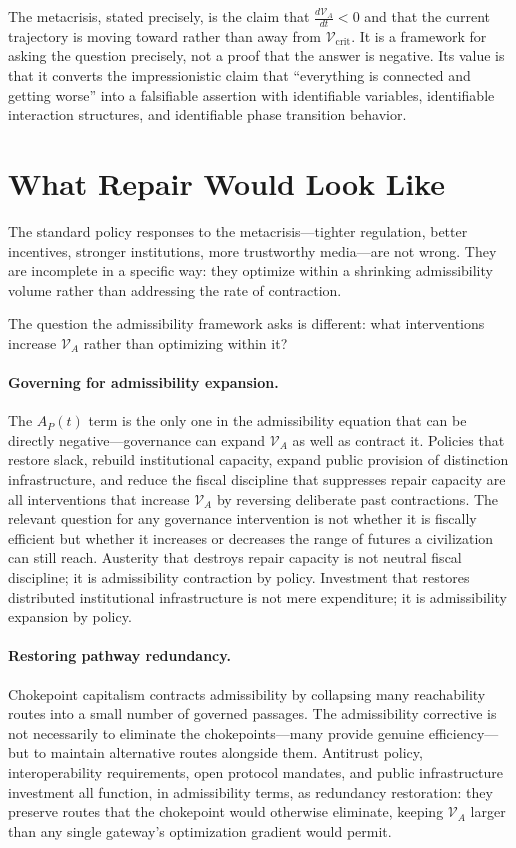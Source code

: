 \documentclass[11pt, letterpaper]{article}
\begin{document}
The metacrisis, stated precisely, is the claim that $\frac{d\mathcal{V}_A}{dt} < 0$ and that the current trajectory is moving toward rather than away from $\mathcal{V}_{\text{crit}}$. It is a framework for asking the question precisely, not a proof that the answer is negative. Its value is that it converts the impressionistic claim that ``everything is connected and getting worse'' into a falsifiable assertion with identifiable variables, identifiable interaction structures, and identifiable phase transition behavior.


\section{What Repair Would Look Like}

The standard policy responses to the metacrisis---tighter regulation, better incentives, stronger institutions, more trustworthy media---are not wrong. They are incomplete in a specific way: they optimize within a shrinking admissibility volume rather than addressing the rate of contraction.

The question the admissibility framework asks is different: what interventions increase $\mathcal{V}_A$ rather than optimizing within it?

\paragraph{Governing for admissibility expansion.} The $A_P(t)$ term is the only one in the admissibility equation that can be directly negative---governance can expand $\mathcal{V}_A$ as well as contract it. Policies that restore slack, rebuild institutional capacity, expand public provision of distinction infrastructure, and reduce the fiscal discipline that suppresses repair capacity are all interventions that increase $\mathcal{V}_A$ by reversing deliberate past contractions. The relevant question for any governance intervention is not whether it is fiscally efficient but whether it increases or decreases the range of futures a civilization can still reach. Austerity that destroys repair capacity is not neutral fiscal discipline; it is admissibility contraction by policy. Investment that restores distributed institutional infrastructure is not mere expenditure; it is admissibility expansion by policy.

\paragraph{Restoring pathway redundancy.} Chokepoint capitalism contracts admissibility by collapsing many reachability routes into a small number of governed passages. The admissibility corrective is not necessarily to eliminate the chokepoints---many provide genuine efficiency---but to maintain alternative routes alongside them. Antitrust policy, interoperability requirements, open protocol mandates, and public infrastructure investment all function, in admissibility terms, as redundancy restoration: they preserve routes that the chokepoint would otherwise eliminate, keeping $\mathcal{V}_A$ larger than any single gateway's optimization gradient would permit.
\end{document}
